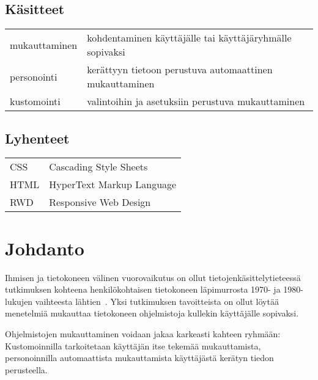 \documentclass[finnish, 12pt, a4paper, elec, utf8, a-1b, online]{aaltothesis}
\date{xx.xx.2022}
\begin{document}
\makecoverpage{}

\makecopyrightpage{}

\begin{abstractpage}[finnish]
\end{abstractpage}

\thesistableofcontents{}


\subsection*{Käsitteet}

\begin{tabular}{ll}
mukauttaminen & kohdentaminen käyttäjälle tai käyttäjäryhmälle sopivaksi \\
personointi & kerättyyn tietoon perustuva automaattinen mukauttaminen \\
kustomointi & valintoihin ja asetuksiin perustuva mukauttaminen
\end{tabular}

\subsection*{Lyhenteet}

\begin{tabular}{ll}
CSS & Cascading Style Sheets \\
HTML & HyperText Markup Language \\
RWD & Responsive Web Design
\end{tabular}

\cleardoublepage{}

\section{Johdanto}

Ihmisen ja tietokoneen välinen vuorovaikutus on ollut tietojenkäsittelytieteessä
tutkimuksen kohteena henkilökohtaisen tietokoneen läpimurrosta 1970- ja
1980-lukujen vaihteesta lähtien~\cite{10.1145/800178.810088}. Yksi tutkimuksen
tavoitteista on ollut löytää menetelmiä mukauttaa tietokoneen ohjelmistoja
kullekin käyttäjälle sopivaksi.

Ohjelmistojen mukauttaminen voidaan jakaa karkeasti kahteen ryhmään:
Kustomoinnilla tarkoitetaan käyttäjän itse tekemää mukauttamista, personoinnilla
automaattista mukauttamista käyttäjästä kerätyn tiedon
perusteella.~\cite{10.1108/03090560710737534}
\end{document}
